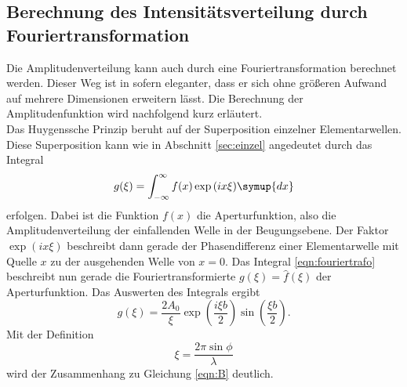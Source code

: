 \subsection{Berechnung des Intensitätsverteilung durch Fouriertransformation}
\label{sec:fourier}
Die Amplitudenverteilung kann auch durch eine Fouriertransformation berechnet werden. Dieser Weg ist in sofern eleganter, dass er sich ohne
größeren Aufwand auf mehrere Dimensionen erweitern lässt. Die Berechnung der Amplitudenfunktion wird nachfolgend kurz erläutert.
\\\noindent
Das Huygenssche Prinzip beruht auf der Superposition einzelner Elementarwellen. Diese Superposition kann wie in Abschnitt \ref{sec:einzel}
angedeutet durch das Integral
\begin{equation}
    g(\xi)=\int_{-\infty}^{\infty}f(x)\exp{(ix\xi)}\symup{dx}
    \label{eqn:fouriertrafo}
\end{equation}
erfolgen. Dabei ist die Funktion $f(x)$ die Aperturfunktion, also die Amplitudenverteilung der einfallenden Welle in der Beugungsebene.
Der Faktor $\exp{(ix\xi)}$ beschreibt dann gerade der Phasendifferenz einer Elementarwelle mit Quelle $x$ zu der ausgehenden Welle von $x=0$.
Das Integral \eqref{eqn:fouriertrafo} beschreibt nun gerade die Fouriertransformierte $g(\xi)=\hat{f}(\xi)$ der Aperturfunktion. Das Auswerten
des Integrals ergibt
\begin{equation*}
    g(\xi)=\frac{2A_0}{\xi}\exp{\left(\frac{i\xi b}{2}\right)}\sin{\left(\frac{\xi b}{2}\right)}    .
\end{equation*}
Mit der Definition
\begin{equation*}
    \xi=\frac{2 \pi \sin{\phi}}{\lambda}
\end{equation*}
wird der Zusammenhang zu Gleichung \eqref{eqn:B} deutlich.
